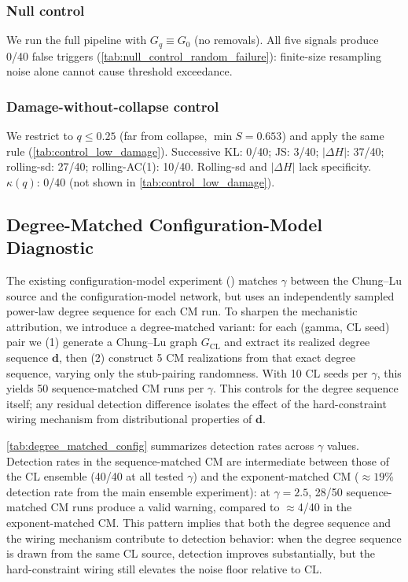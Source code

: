 \documentclass{nws}
\begin{document}
\subsubsection*{Null control}
We run the full pipeline with $G_q \equiv G_0$ (no removals). All five signals produce
0/40 false triggers (\autoref{tab:null_control_random_failure}): finite-size resampling
noise alone cannot cause threshold exceedance.



\subsubsection*{Damage-without-collapse control}
We restrict to $q\le 0.25$ (far from collapse, $\min S=0.653$) and apply the same rule
(\autoref{tab:control_low_damage}). Successive KL: 0/40; JS: 3/40; $|\Delta H|$: 37/40;
rolling-sd: 27/40; rolling-AC(1): 10/40. Rolling-sd and $|\Delta H|$ lack specificity.
$\kappa(q)$: 0/40 (not shown in \autoref{tab:control_low_damage}).



\subsection{Degree-Matched Configuration-Model Diagnostic}
\label{sec:degree_matched_config}
The existing configuration-model experiment () matches
$\gamma$ between the Chung--Lu source and the configuration-model network, but uses an
independently sampled power-law degree sequence for each CM run.
To sharpen the mechanistic attribution, we introduce a degree-matched variant:
for each (gamma, CL seed) pair we (1) generate a Chung--Lu graph $G_{\mathrm{CL}}$ and extract
its realized degree sequence $\mathbf{d}$, then (2) construct 5 CM realizations from
that exact degree sequence, varying only the stub-pairing randomness.
With 10 CL seeds per $\gamma$, this yields 50 sequence-matched CM runs per $\gamma$.
This controls for the degree sequence itself; any residual detection difference isolates the
effect of the hard-constraint wiring mechanism from distributional properties of $\mathbf{d}$.

\autoref{tab:degree_matched_config} summarizes detection rates across $\gamma$ values.
Detection rates in the sequence-matched CM are intermediate between those of the CL ensemble
(40/40 at all tested $\gamma$) and the exponent-matched CM ($\approx19$\% detection rate
from the main ensemble experiment): at $\gamma=2.5$, 28/50 sequence-matched CM runs
produce a valid warning, compared to $\approx$4/40 in the exponent-matched CM.
This pattern implies that both the degree sequence and the wiring mechanism
contribute to detection behavior: when the degree sequence is drawn from the same CL
source, detection improves substantially, but the hard-constraint wiring still elevates the noise
floor relative to CL.
\end{document}
